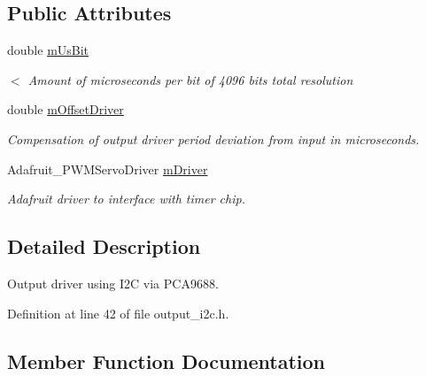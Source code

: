 \subsection*{Public Attributes}
\begin{DoxyCompactItemize}
\item 
double \hyperlink{classSPMB_1_1OutputDriverI2C_a1dc1d614d4e099105b124656a871aa83}{m\+Us\+Bit}\hypertarget{classSPMB_1_1OutputDriverI2C_a1dc1d614d4e099105b124656a871aa83}{}\label{classSPMB_1_1OutputDriverI2C_a1dc1d614d4e099105b124656a871aa83}

\begin{DoxyCompactList}\small\item\em $<$ Amount of microseconds per bit of 4096 bits total resolution \end{DoxyCompactList}\item 
double \hyperlink{classSPMB_1_1OutputDriverI2C_a8ab5bd3883d50cca560313b5275b81e5}{m\+Offset\+Driver}\hypertarget{classSPMB_1_1OutputDriverI2C_a8ab5bd3883d50cca560313b5275b81e5}{}\label{classSPMB_1_1OutputDriverI2C_a8ab5bd3883d50cca560313b5275b81e5}

\begin{DoxyCompactList}\small\item\em Compensation of output driver period deviation from input in microseconds. \end{DoxyCompactList}\item 
Adafruit\+\_\+\+P\+W\+M\+Servo\+Driver \hyperlink{classSPMB_1_1OutputDriverI2C_aecd74104de6faf86afbc9c1f9cd0b50a}{m\+Driver}\hypertarget{classSPMB_1_1OutputDriverI2C_aecd74104de6faf86afbc9c1f9cd0b50a}{}\label{classSPMB_1_1OutputDriverI2C_aecd74104de6faf86afbc9c1f9cd0b50a}

\begin{DoxyCompactList}\small\item\em Adafruit driver to interface with timer chip. \end{DoxyCompactList}\end{DoxyCompactItemize}


\subsection{Detailed Description}
Output driver using I2C via P\+C\+A9688. 

Definition at line 42 of file output\+\_\+i2c.\+h.



\subsection{Member Function Documentation}
